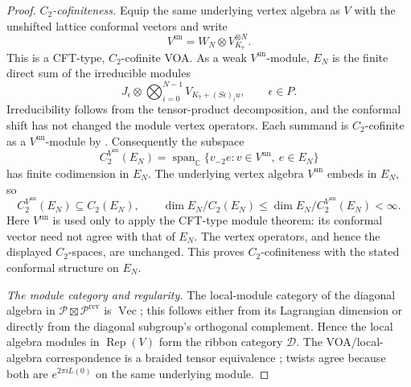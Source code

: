 \documentclass[11pt,a4paper]{article}
\numberwithin{equation}{section}
\theoremstyle{definition}\newtheorem{definition}[theorem]{Definition}
\theoremstyle{remark}\newtheorem{remark}[theorem]{Remark}
\begin{document}
\begin{proof}
\emph{$C_2$-cofiniteness.}
Equip the same underlying vertex algebra as $V$ with the unshifted
lattice conformal vectors and write
\[
 V^{\mathrm{un}}=W_N\otimes V_{K_7}^{\otimes N}.
\]
This is a CFT-type, $C_2$-cofinite VOA. As a weak
$V^{\mathrm{un}}$-module, $E_N$ is the finite direct sum of the
irreducible modules
\[
 J_\epsilon\otimes
 \bigotimes_{i=0}^{N-1}V_{K_7+(S\epsilon)_i u},
 \qquad \epsilon\in P.
\]
Irreducibility follows from the tensor-product decomposition, and
the conformal shift has not changed the module vertex operators.
Each summand is $C_2$-cofinite as a $V^{\mathrm{un}}$-module by
\cite[Proposition 5.2]{abd}. Consequently the subspace
\[
 C_2^{V^{\mathrm{un}}}(E_N)
 =\operatorname{span}_{\mathbb C}
       \{v_{-2}e:v\in V^{\mathrm{un}},\ e\in E_N\}
\]
has finite codimension in $E_N$. The underlying vertex algebra
$V^{\mathrm{un}}$ embeds in $E_N$, so
\[
 C_2^{V^{\mathrm{un}}}(E_N)\subseteq C_2(E_N),
 \qquad
 \dim E_N/C_2(E_N)
 \leq\dim E_N/C_2^{V^{\mathrm{un}}}(E_N)<\infty.
\]
Here $V^{\mathrm{un}}$ is used only to apply the CFT-type module
theorem: its conformal vector need not agree with that of $E_N$.
The vertex operators, and hence the displayed $C_2$-spaces, are
unchanged. This proves $C_2$-cofiniteness with the stated conformal
structure on $E_N$.

\emph{The module category and regularity.}
The local-module category of the diagonal algebra in
$\mathcal P\boxtimes\mathcal P^{\mathrm{rev}}$ is
$\operatorname{Vec}$; this follows either from its Lagrangian
dimension or directly from the diagonal subgroup's orthogonal
complement. Hence the local algebra modules in
$\operatorname{Rep}(V)$ form the ribbon category $\mathcal D$.
The VOA/local-algebra correspondence is a braided tensor equivalence
\cite[Theorem 3.65]{ckm}; twists agree because both are
$e^{2\pi i L(0)}$ on the same underlying module.


\end{proof}
\end{document}
